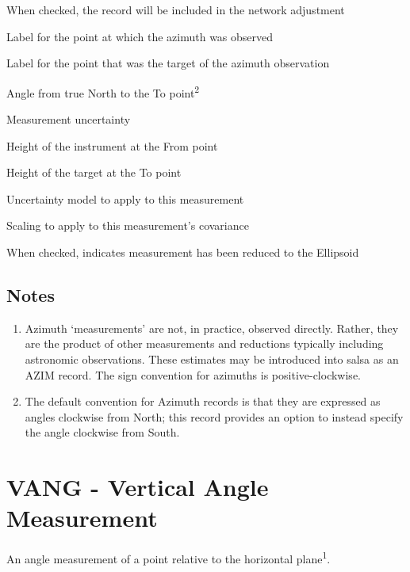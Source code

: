 \begin{description}[leftmargin=!,labelwidth=\widthof{\bfseries Refract Coeff:}]
\item[Enabled:] When checked, the record will be included in the network adjustment
\item[From:] Label for the point at which the azimuth was observed
\item[To:] Label for the point that was the target of the azimuth observation
\item[Angle:] Angle from true North to the To point\textsuperscript{2}
\item[Sigma:] Measurement uncertainty
\item[Height From:] Height of the instrument at the From point
\item[Height To:] Height of the target at the To point
\item[Uncertainty:] Uncertainty model to apply to this measurement
\item[Scaling:] Scaling to apply to this measurement's covariance
\item[Reduced:] When checked, indicates measurement has been reduced to the Ellipsoid
\end{description}

\subsection*{Notes}
\begin{enumerate}
\item Azimuth `measurements' are not, in practice, observed directly.  Rather, they are the product of other measurements and reductions typically including astronomic observations.  These estimates may be introduced into \textsf{salsa} as an AZIM record.  The sign convention for azimuths is positive-clockwise.
\item The default convention for Azimuth records is that they are expressed as angles clockwise from North; this record provides an option to instead specify the angle clockwise from South.
\end{enumerate}


\newpage
\section{VANG - Vertical Angle Measurement}

An angle measurement of a point relative to the horizontal plane\textsuperscript{1}.

